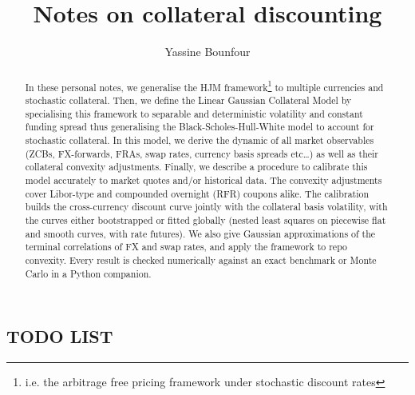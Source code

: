 \documentclass[11pt,english]{amsart}
\title{Notes on collateral discounting}%
\author{Yassine Bounfour}
\theoremstyle{definition}
\begin{document}


\maketitle


\begin{abstract}
In these personal notes, we generalise the HJM framework\footnote{i.e. the arbitrage free pricing framework under stochastic discount rates} to multiple currencies and stochastic collateral. Then, we define the Linear Gaussian Collateral Model by specialising this framework to separable and deterministic volatility and constant funding spread thus generalising the Black-Scholes-Hull-White model to account for stochastic collateral. In this model, we derive the dynamic of all market observables (ZCBs, FX-forwards, FRAs, swap rates, currency basis spreads etc\ldots)  as well as their collateral convexity adjustments. Finally, we describe a procedure to calibrate this model accurately to market quotes and/or historical data.  
The convexity adjustments cover Libor-type and compounded overnight (RFR) coupons alike. The calibration builds the cross-currency discount curve jointly with the collateral basis volatility, with the curves either bootstrapped or fitted globally (nested least squares on piecewise flat and smooth curves, with rate futures). We also give Gaussian approximations of the terminal correlations of FX and swap rates, and apply the framework to repo convexity. Every result is checked numerically against an exact benchmark or Monte Carlo in a Python companion.
\end{abstract}


\subsection*{TODO LIST}%
\end{document}
